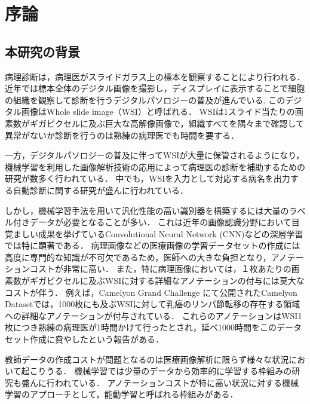\chapter{序論}

\section{本研究の背景}

病理診断は，病理医がスライドガラス上の標本を観察することにより行われる．
近年では標本全体のデジタル画像を撮影し，ディスプレイに表示することで細胞の組織を観察して診断を行うデジタルパソロジーの普及が進んでいる\cite{pantanowitz2010digital}.
このデジタル画像はWhole slide image（WSI）と呼ばれる．
WSIは1スライド当たりの画素数がギガピクセルに及ぶ巨大な高解像画像で，組織すべてを隅々まで確認して異常がないか診断を行うのは熟練の病理医でも時間を要する．

一方，デジタルパソロジーの普及に伴ってWSIが大量に保管されるようになり，機械学習を利用した画像解析技術の応用によって病理医の診断を補助するための研究が数多く行われている\cite{gurcan2009histopathological, komuraishikawa, litjens2017survey}．
中でも，WSIを入力として対応する病名を出力する自動診断に関する研究が盛んに行われている\cite{doyle2008automated,dundar2011computerized}．

しかし，機械学習手法を用いて汎化性能の高い識別器を構築するには大量のラベル付きデータが必要となることが多い．
これは近年の画像認識分野において目覚ましい成果を挙げているConvolutional Neural Network (CNN)などの深層学習では特に顕著である．
病理画像などの医療画像の学習データセットの作成には高度に専門的な知識が不可欠であるため，医師への大きな負担となり，アノテーションコストが非常に高い．
また，特に病理画像においては，１枚あたりの画素数がギガピクセルに及ぶWSIに対する詳細なアノテーションの付与には莫大なコストが伴う．
例えば，Camelyon Grand Challenge \cite{Camelyon17}にて公開されたCamelyon Datasetでは，1000枚にも及ぶWSIに対して乳癌のリンパ節転移の存在する領域への詳細なアノテーションが付与されている．
これらのアノテーションはWSI1枚につき熟練の病理医が1時間かけて行ったとされ，延べ1000時間をこのデータセット作成に費やしたという報告がある．

教師データの作成コストが問題となるのは医療画像解析に限らず様々な状況において起こりうる．
機械学習では少量のデータから効率的に学習する枠組みの研究も盛んに行われている．
アノテーションコストが特に高い状況に対する機械学習のアプローチとして，能動学習\cite{settles2010active}と呼ばれる枠組みがある．

